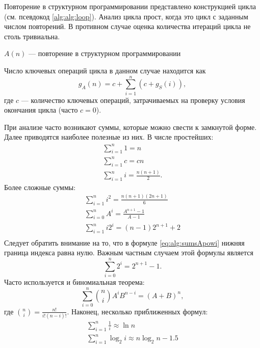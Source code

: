 Повторение в структурном программировании представлено конструкцией цикла (см. псевдокод \ref{alg:alg:loop}). Анализ цикла прост, когда это цикл с заданным числом повторений. В противном случае оценка количества итераций цикла не столь тривиальна.
\begin{algorithm}
    \caption{$A(n)$ --- повторение в структурном программировании}
    \label{alg:alg:loop}
    \begin{algorithmic}[1]
        
        \ENDFOR
    \end{algorithmic}
\end{algorithm}
Число ключевых операций цикла в данном случае находится как
\[
    g_A(n)=c+\sum_{i=1}^{n}(c+g_S(i)),
\]
где $c$ --- количество ключевых операций, затрачиваемых на проверку условия окончания цикла (часто $c=0$).

При анализе часто возникают суммы, которые можно свести к замкнутой форме. Далее приводятся наиболее полезные из них. В числе простейших:
\begin{gather}
    \sum_{i=1}^{n}1=n\\
    \sum_{i=1}^{n}c=cn\\
    \sum_{i=1}^{n}i=\frac{n(n+1)}{2}.
\end{gather}
Более сложные суммы:
\begin{gather}
    \sum_{i=1}^{n}i^2=\frac{n(n+1)(2n+1)}{6}\\
    \sum_{i=0}^{n}A^i=\frac{A^{n+1}-1}{A-1}\label{eq:alg:sumsApowi}\\
    \sum_{i=1}^{n}i2^i=(n-1)2^{n+1}+2\\
\end{gather}
Следует обратить внимание на то, что в формуле \eqref{eq:alg:sumsApowi} нижняя граница индекса равна нулю. Важным частным случаем этой формулы является 
\[
    \sum_{i=0}^{n}2^i=2^{n+1}-1.
\] 
Часто используется и биномиальная теорема:
\begin{equation}
    \label{eq:alg:binomTheorem}
    \sum_{i=0}^{n}\binom{n}{i}A^{i}B^{n-i} = (A+B)^{n},
\end{equation}
где $\binom{n}{i}=\frac{n!}{i!(n-i)!}$.
Наконец, несколько приближенных формул:
\begin{gather}
    \sum_{i=1}^{n}\frac{1}{i}\approx \ln n\\
    \sum_{i=1}^{n}\log_2i\approx n\log_2n-1.5
\end{gather}


